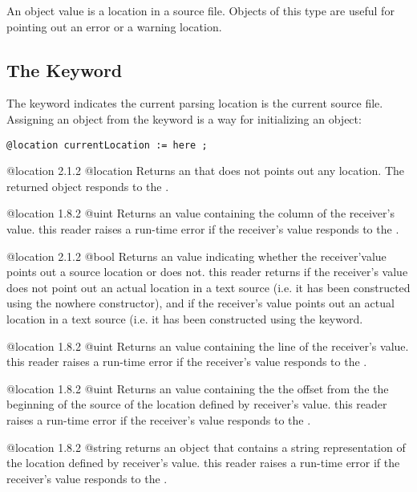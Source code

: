 
An  object value is a location in a source file. Objects of this type are useful for pointing out an error or a warning location.

\subsection{The  Keyword}

The  keyword indicates the current parsing location is the current source file. Assigning an  object from the  keyword is a way for initializing an  object:\newline

\texttt{@location currentLocation := here ;}

{@location}
{2.1.2}
{@location}
{Returns an  that does not points out any location.}
{The returned object responds  to the .}


{@location}
{1.8.2}
{@uint}
{Returns an  value containing the column of the receiver's value.}
{this reader raises a run-time error if the receiver's value responds  to the .}


{@location}
{2.1.2}
{@bool}
{Returns an  value indicating whether the receiver'value points out a source location or does not.}
{this reader returns  if the receiver's value does not point out an actual location in a text source (i.e. it has been constructed using the nowhere constructor), and  if the receiver's value points out an actual location in a text source (i.e. it has been constructed using the  keyword.}


{@location}
{1.8.2}
{@uint}
{Returns an  value containing the line of the receiver's value.}
{this reader raises a run-time error if the receiver's value responds  to the .}


{@location}
{1.8.2}
{@uint}
{Returns an  value containing the the offset from the the beginning of the source of the location defined by receiver's value.}
{this reader raises a run-time error if the receiver's value responds  to the .}


{@location}
{1.8.2}
{@string}
{returns an  object that contains a string representation of the location defined by receiver's value.}
{this reader raises a run-time error if the receiver's value responds  to the .}
